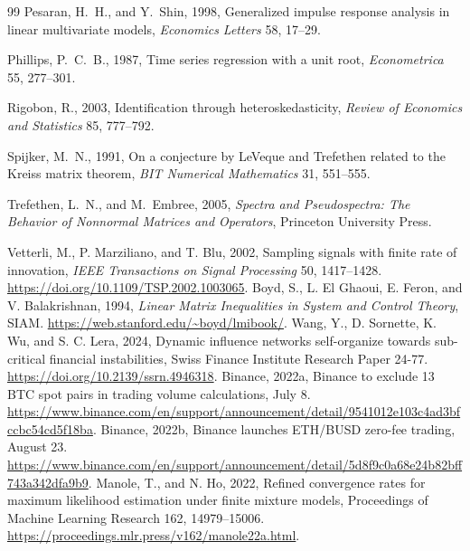 \documentclass[12pt]{article}
\theoremstyle{definition}
\theoremstyle{remark}
\begin{document}
\begin{thebibliography}{99}
Pesaran, H.~H., and Y.~Shin, 1998, Generalized impulse response analysis in linear multivariate models, \emph{Economics Letters} 58, 17--29.

Phillips, P.~C.~B., 1987, Time series regression with a unit root, \emph{Econometrica} 55, 277--301.

Rigobon, R., 2003, Identification through heteroskedasticity, \emph{Review of Economics and Statistics} 85, 777--792.

Spijker, M.~N., 1991, On a conjecture by LeVeque and Trefethen related to the Kreiss matrix theorem, \emph{BIT Numerical Mathematics} 31, 551--555.

Trefethen, L.~N., and M.~Embree, 2005, \emph{Spectra and Pseudospectra: The Behavior of Nonnormal Matrices and Operators}, Princeton University Press.


 Vetterli, M., P. Marziliano, and T. Blu, 2002, Sampling signals with finite rate of innovation, \emph{IEEE Transactions on Signal Processing} 50, 1417--1428. \url{https://doi.org/10.1109/TSP.2002.1003065}.
 Boyd, S., L. El Ghaoui, E. Feron, and V. Balakrishnan, 1994, \emph{Linear Matrix Inequalities in System and Control Theory}, SIAM. \url{https://web.stanford.edu/~boyd/lmibook/}.
 Wang, Y., D. Sornette, K. Wu, and S. C. Lera, 2024, Dynamic influence networks self-organize towards sub-critical financial instabilities, Swiss Finance Institute Research Paper 24-77. \url{https://doi.org/10.2139/ssrn.4946318}.
 Binance, 2022a, Binance to exclude 13 BTC spot pairs in trading volume calculations, July 8. \url{https://www.binance.com/en/support/announcement/detail/9541012e103c4ad3bfccbc54cd5f18ba}.
 Binance, 2022b, Binance launches ETH/BUSD zero-fee trading, August 23. \url{https://www.binance.com/en/support/announcement/detail/5d8f9c0a68e24b82bff743a342dfa9b9}.
 Manole, T., and N. Ho, 2022, Refined convergence rates for maximum likelihood estimation under finite mixture models, Proceedings of Machine Learning Research 162, 14979--15006. \url{https://proceedings.mlr.press/v162/manole22a.html}.
\end{thebibliography}
\end{document}

